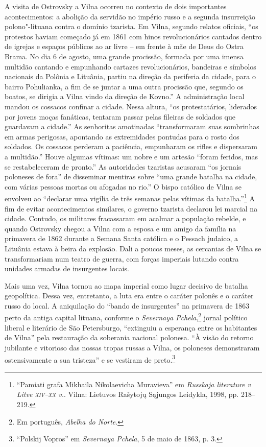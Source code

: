 A visita de Ostrovsky a Vilna ocorreu no contexto de dois importantes
acontecimentos: a abolição da servidão no império russo e a segunda
insurreição polono"-lituana contra o domínio tzarista. Em Vilna, segundo
relatos oficiais, ``os protestos haviam começado já em 1861 com hinos
revolucionários cantados dentro de igrejas e espaços públicos ao ar
livre -- em frente à mãe de Deus do Ostra Brama. No dia 6 de agosto, uma
grande procissão, formada por uma imensa multidão cantando e empunhando
cartazes revolucionários, bandeiras e símbolos nacionais da Polônia e
Lituânia, partiu na direção da periferia da cidade, para o bairro
Pohulianka, a fim de se juntar a uma outra procissão que, segundo os
boatos, se dirigia a Vilna vindo da direção de Kovno.'' A administração
local mandou os cossacos confinar a cidade. Nessa altura, ``os
protestatários, liderados por jovens moças fanáticas, tentaram passar
pelas fileiras de soldados que guardavam a cidade.'' As senhoritas
amotinadas ``transformaram suas sombrinhas em armas perigosas, apontando
as extremidades pontudas para o rosto dos soldados. Os cossacos perderam
a paciência, empunharam os rifles e dispersaram a multidão.'' Houve
algumas vítimas: um nobre e um artesão ``foram feridos, mas se
restabeleceram de pronto.'' As autoridades tzaristas acusaram ``os
jornais poloneses de fora'' de disseminar mentiras sobre ``uma grande
batalha na cidade, com várias pessoas mortas ou afogadas no rio.'' O
bispo católico de Vilna se envolveu ao ``declarar uma vigília de três
semanas pelas vítimas da batalha.''\footnote{``Pamiati grafa Mikhaila Nikolaevicha Muravieva'' em \textit{Russkaja literature v Litve \textsc{xiv}--\textsc{xx} v.}. Vilna: Lietuvos Rašytojų Sąjungos Leidykla, 1998, pp. 218--219.} A fim de evitar acontecimentos similares, o governo tzarista declarou lei marcial na cidade. Contudo,
os militares fracassaram em acalmar a população rebelde, e quando
Ostrovsky chegou a Vilna com a esposa e um amigo da família na
primavera de 1862 durante a Semana Santa católica e o Pessach judaico, a
Lituânia estava à beira da explosão. Dali a poucos meses, as cercanias
de Vilna se transformariam num teatro de guerra, com forças imperiais
lutando contra unidades armadas de insurgentes locais.

Mais uma vez, Vilna tornou ao mapa imperial como lugar decisivo de
batalha geopolítica. Dessa vez, entretanto, a luta era entre o caráter
polonês e o caráter russo do local. A aniquilação do ``bando de
insurgentes'' na primavera de 1863 perto da antiga capital lituana,
conforme o \textit{Severnaya Pchela},\footnote{Em português, \textit{Abelha do Norte}.} jornal
político liberal e literário de São Petersburgo, ``extinguiu a esperança
entre os habitantes de Vilna'' pela restauração da soberania nacional
polonesa. ``À visão do retorno jubilante e vitorioso das nossas tropas
russas a Vilna, os poloneses demonstraram ostensivamente a sua
tristeza'' e se vestiram de preto.\footnote{``Polskij Vopros'' em \textit{Severnaya Pchela}, 5 de maio de 1863, p. 3.}


